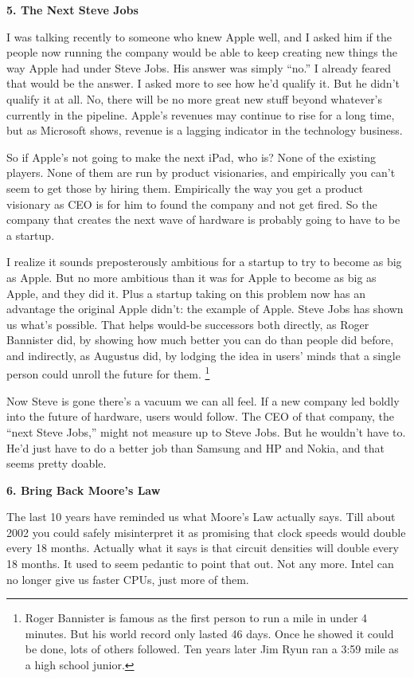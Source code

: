 \textbf{5. The Next Steve Jobs}

I was talking recently to someone who knew Apple well, and I asked him
if the people now running the company would be able to keep creating new
things the way Apple had under Steve Jobs. His answer was simply ``no.''
I already feared that would be the answer. I asked more to see how he'd
qualify it. But he didn't qualify it at all. No, there will be no more
great new stuff beyond whatever's currently in the pipeline. Apple's
revenues may continue to rise for a long time, but as Microsoft shows,
revenue is a lagging indicator in the technology business.

So if Apple's not going to make the next iPad, who is? None of the
existing players. None of them are run by product visionaries, and
empirically you can't seem to get those by hiring them. Empirically the
way you get a product visionary as CEO is for him to found the company
and not get fired. So the company that creates the next wave of hardware
is probably going to have to be a startup.

I realize it sounds preposterously ambitious for a startup to try to
become as big as Apple. But no more ambitious than it was for Apple to
become as big as Apple, and they did it. Plus a startup taking on this
problem now has an advantage the original Apple didn't: the example of
Apple. Steve Jobs has shown us what's possible. That helps would-be
successors both directly, as Roger Bannister did, by showing how much
better you can do than people did before, and indirectly, as Augustus
did, by lodging the idea in users' minds that a single person could
unroll the future for them. \footnote{Roger Bannister is famous as the first person to run a mile in
under 4 minutes. But his world record only lasted 46 days. Once he
showed it could be done, lots of others followed. Ten years later Jim
Ryun ran a 3:59 mile as a high school junior.}

Now Steve is gone there's a vacuum we can all feel. If a new company led
boldly into the future of hardware, users would follow. The CEO of that
company, the ``next Steve Jobs,'' might not measure up to Steve Jobs.
But he wouldn't have to. He'd just have to do a better job than Samsung
and HP and Nokia, and that seems pretty doable.

\textbf{6. Bring Back Moore's Law}

The last 10 years have reminded us what Moore's Law actually says. Till
about 2002 you could safely misinterpret it as promising that clock
speeds would double every 18 months. Actually what it says is that
circuit densities will double every 18 months. It used to seem pedantic
to point that out. Not any more. Intel can no longer give us faster
CPUs, just more of them.

